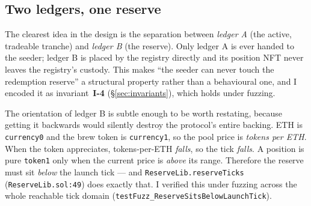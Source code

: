 \documentclass[10pt,a4paper]{article}
\newcommand{\code}[1]{\texttt{\small #1}}
\begin{document}
\begin{center}
\end{center}

\subsection{Two ledgers, one reserve}

The clearest idea in the design is the separation between \emph{ledger A} (the
active, tradeable tranche) and \emph{ledger B} (the reserve). Only ledger A is
ever handed to the seeder; ledger B is placed by the registry directly and its
position NFT never leaves the registry's custody. This makes ``the seeder can
never touch the redemption reserve'' a structural property rather than a
behavioural one, and I encoded it as invariant~\textbf{I-4}
(\S\ref{sec:invariants}), which holds under fuzzing.

The orientation of ledger B is subtle enough to be worth restating, because
getting it backwards would silently destroy the protocol's entire backing. ETH
is \code{currency0} and the brew token is \code{currency1}, so the pool price is
\emph{tokens per ETH}. When the token appreciates, tokens-per-ETH \emph{falls},
so the tick \emph{falls}. A position is pure \code{token1} only when the current
price is \emph{above} its range. Therefore the reserve must sit \emph{below} the
launch tick --- and \code{ReserveLib.reserveTicks}
(\code{ReserveLib.sol:49}) does exactly that. I verified this under fuzzing
across the whole reachable tick domain
(\code{testFuzz\_ReserveSitsBelowLaunchTick}).
\end{document}
